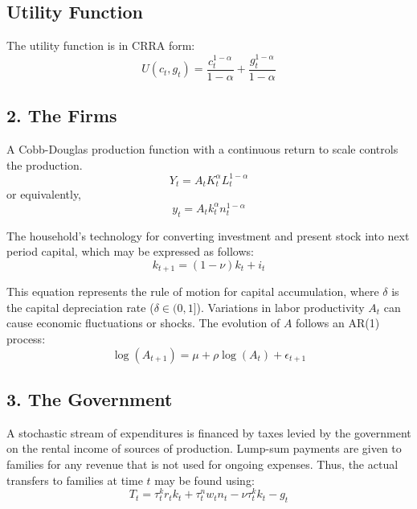 \documentclass{article}
\begin{document}
\subsection*{Utility Function}

The utility function is in CRRA form:
\begin{equation}
    U(c_t, g_t) = \frac{c_t^{1-\alpha}}{1-\alpha} + \frac{g_t^{1-\alpha}}{1-\alpha}
\end{equation}

\subsection*{2. The Firms}

A Cobb-Douglas production function with a continuous return to scale controls the production.
\begin{equation}
    Y_t = A_t K_t^{\alpha} L_t^{1-\alpha}
\end{equation}
or equivalently,
\begin{equation}
    y_t = A_t k_t^{\alpha} n_t^{1-\alpha}
\end{equation}


The household's technology for converting investment and present stock into next period capital, which may be expressed as follows:
\begin{equation}
    k_{t+1} = (1 - \nu) k_t + i_t
\end{equation}

This equation represents the rule of motion for capital accumulation, where \( \delta \) is the capital depreciation rate (\( \delta \in (0,1] \)). Variations in labor productivity \( A_t \) can cause economic fluctuations or shocks. The evolution of \( A \) follows an AR(1) process:
\begin{equation}
    \log(A_{t+1}) = \mu + \rho \log(A_t) + \epsilon_{t+1}
\end{equation}

\subsection*{3. The Government}

A stochastic stream of expenditures is financed by taxes levied by the government on the rental income of sources of production. Lump-sum payments are given to families for any revenue that is not used for ongoing expenses. Thus, the actual transfers to families at time \( t \) may be found using:
\begin{equation}
    T_t = \tau^k_t r_t k_t + \tau^n_t w_t n_t - \nu \tau^k_t k_t - g_t
\end{equation}
\end{document}
